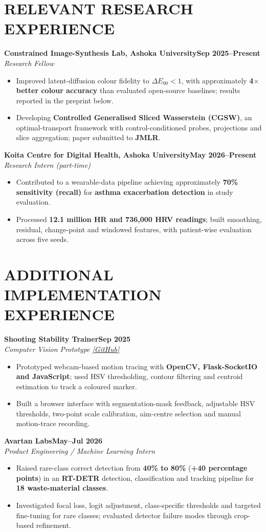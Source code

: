 \documentclass[10pt,a4paper]{article}
\newcommand{\entry}[3]{\noindent\textbf{#1}\hfill\textbf{#3}\\[-1pt]\textit{#2}\par}
\newenvironment{cvitems}{\begin{itemize}[leftmargin=1.1em,label=\textbullet,itemsep=2pt,topsep=3pt,parsep=0pt,partopsep=0pt]}{\end{itemize}}
\begin{document}
\section{RELEVANT RESEARCH EXPERIENCE}
\entry{Constrained Image-Synthesis Lab, Ashoka University}{Research Fellow}{Sep 2025--Present}
\begin{cvitems}
  \item Improved latent-diffusion colour fidelity to $\Delta E_{00}<1$, with approximately \textbf{4$\times$ better colour accuracy} than evaluated open-source baselines; results reported in the preprint below.
  \item Developing \textbf{Controlled Generalised Sliced Wasserstein (CGSW)}, an optimal-transport framework with control-conditioned probes, projections and slice aggregation; paper submitted to \textbf{JMLR}.
\end{cvitems}
\entry{Koita Centre for Digital Health, Ashoka University}{Research Intern (part-time)}{May 2026--Present}
\begin{cvitems}
  \item Contributed to a wearable-data pipeline achieving approximately \textbf{70\% sensitivity (recall)} for \textbf{asthma exacerbation detection} in study evaluation.
  \item Processed \textbf{12.1 million HR and 736,000 HRV readings}; built smoothing, residual, change-point and windowed features, with patient-wise evaluation across five seeds.
\end{cvitems}
\section{ADDITIONAL IMPLEMENTATION EXPERIENCE}
\entry{Shooting Stability Trainer}{Computer Vision Prototype \href{https://github.com/MushuRam01/Shooting-Stability-Trainer}{[GitHub]}}{Sep 2025}
\begin{cvitems}
  \item Prototyped webcam-based motion tracing with \textbf{OpenCV, Flask-SocketIO and JavaScript}; used HSV thresholding, contour filtering and centroid estimation to track a coloured marker.
  \item Built a browser interface with segmentation-mask feedback, adjustable HSV thresholds, two-point scale calibration, aim-centre selection and manual motion-trace recording.
\end{cvitems}
\entry{Avartan Labs}{Product Engineering / Machine Learning Intern}{May--Jul 2026}
\begin{cvitems}
  \item Raised rare-class correct detection from \textbf{40\% to 80\%} (\textbf{+40 percentage points}) in an \textbf{RT-DETR} detection, classification and tracking pipeline for \textbf{18 waste-material classes}.
  \item Investigated focal loss, logit adjustment, class-specific thresholds and targeted fine-tuning for rare classes; evaluated detector failure modes through crop-based refinement.
\end{cvitems}
\end{document}
